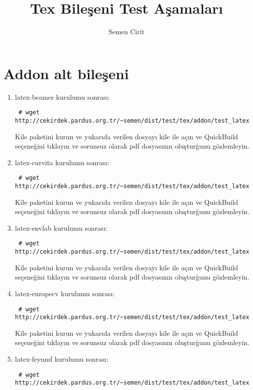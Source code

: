 \documentclass[a4paper,10pt]{article}
\title{Tex Bileşeni Test Aşamaları}
\author{Semen Cirit}
\begin{document}
\maketitle
\section{Addon alt bileşeni}
\begin{enumerate}
\item  latex-beamer kurulumu sonrası:
\begin{verbatim}
 # wget http://cekirdek.pardus.org.tr/~semen/dist/test/tex/addon/test_latexbeamer.tex
\end{verbatim}

Kile paketini kurun ve yukarıda verilen dosyayı kile ile açın ve QuickBuild  seçeneğini tıklayın ve sorunsuz olarak pdf dosyasının oluşturğunu gözlemleyin.
\item  latex-curvita kurulumu sonrası:
\begin{verbatim}
 # wget http://cekirdek.pardus.org.tr/~semen/dist/test/tex/addon/test_latexcurrvita.tex
\end{verbatim}

Kile paketini kurun ve yukarıda verilen dosyayı kile ile açın ve QuickBuild  seçeneğini tıklayın ve sorunsuz olarak pdf dosyasının oluşturğunu gözlemleyin.
\item  latex-envlab kurulumu sonrası:
\begin{verbatim}
 # wget http://cekirdek.pardus.org.tr/~semen/dist/test/tex/addon/test_latexenvlab.tex
\end{verbatim}

Kile paketini kurun ve yukarıda verilen dosyayı kile ile açın ve QuickBuild  seçeneğini tıklayın ve sorunsuz olarak pdf dosyasının oluşturğunu gözlemleyin.
\item  latex-europecv kurulumu sonrası:
\begin{verbatim}
 # wget http://cekirdek.pardus.org.tr/~semen/dist/test/tex/addon/test_latexeuropecv.tex
\end{verbatim}

Kile paketini kurun ve yukarıda verilen dosyayı kile ile açın ve QuickBuild  seçeneğini tıklayın ve sorunsuz olarak pdf dosyasının oluşturğunu gözlemleyin.
\item  latex-feynmf kurulumu sonrası:
\begin{verbatim}
 # wget http://cekirdek.pardus.org.tr/~semen/dist/test/tex/addon/test_latexfeynmf.tex
\end{verbatim}


\end{enumerate}
\end{document}
